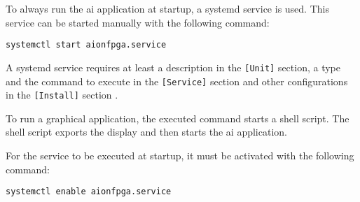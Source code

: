 To always run the \acrshort{ai} application at startup, a systemd service is used.
This service can be started manually with the following command:
\begin{lstlisting}[style=bash, caption={}, label=lst:start_service]
  systemctl start aionfpga.service
\end{lstlisting}
A systemd service requires at least a description in the \texttt{[Unit]} section, a type and the command to execute in the \texttt{[Service]} section and other configurations in the \texttt{[Install]} section \cite{systemd}.

To run a graphical application, the executed command starts a shell script.
The shell script exports the display and then starts the \acrshort{ai} application.

For the service to be executed at startup, it must be activated with the following command:
\begin{lstlisting}[style=bash, caption={}, label=lst:enable_service]
  systemctl enable aionfpga.service
\end{lstlisting}
